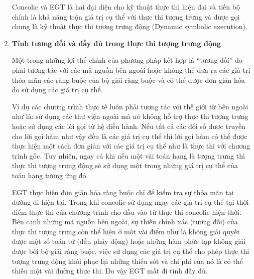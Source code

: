 \documentclass[12pt,a4paper]{article}
\begin{document}
\begin{enumerate}
Concolic và EGT là hai đại diện cho kỹ thuật thực thi hiện đại và tiến bộ chính là khả năng trộn giá trị cụ thể với thực thi tượng trưng và được gọi chung là kỹ thuật thực thi tượng trưng động (Dynamic symbolic execution).

\item \textbf{Tính tương đối và đầy đủ trong thực thi tượng trưng động}

Một trong những lợi thế chính của phương pháp kết hợp là “tương đối” do phải tương tác với các mã nguồn bên ngoài hoặc không thể đưa ra các giá trị thỏa mãn các ràng buộc của bộ giải ràng buộc và có thể được đơn giản hóa do sử dụng các giá trị cụ thể.

Ví dụ các chương trình thực tế luôn phải tương tác với thế giới từ bên ngoài như là: sử dụng các thư viện ngoài mà nó không hỗ trợ thực thi tượng trưng hoặc sử dụng các lời gọi từ hệ điều hành. Nếu tất cả các đối số được truyền cho lời gọi hàm như vậy đều là các giá trị cụ thể thì lời gọi hàm có thể được thực hiện một cách đơn giản với các giá trị cụ thể như là thực thi với chương trình gốc. Tuy nhiên, ngay cả khi nếu một vài toán hạng là tượng trưng thì thực thi tượng trưng động sẽ sử dụng một trong những giá trị cụ thể của toán hạng tương ứng đó.

EGT thực hiện đơn giản hóa ràng buộc chỉ để kiểm tra sự thỏa mãn tại đường đi hiện tại. Trong khi concolic sử dụng ngay các giá trị cụ thể tại thời điểm thực thi của chương trình cho đầu vào từ thực thi concolic hiện thời. Bên cạnh những mã nguồn bên ngoài, sự thiếu chính xác (tương đối) của thực thi tượng trưng còn thể hiện ở một vài điểm như là không giải quyết được một số toán tử (dấu phảy động) hoặc những hàm phức tạp không giải được bởi bộ giải ràng buộc, việc sử dụng các giá trị cụ thể cho phép thực thi tượng trưng động khôi phục lại những thiếu sót và chi phí của nó là có thể thiếu một vài đường thực thi. Do vậy EGT mất đi tính đầy đủ.


\end{enumerate}
\end{document}

